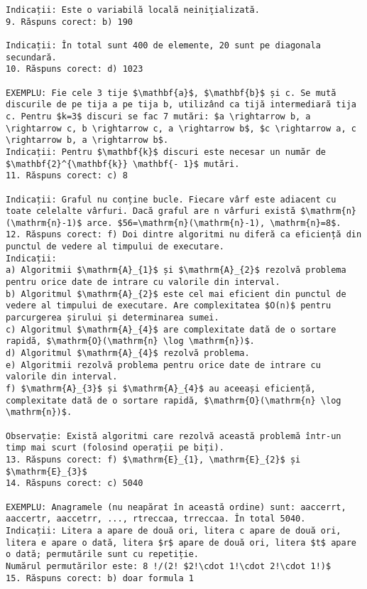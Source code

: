 \begin{verbatim}
Indicații: Este o variabilă locală neiniţializată.
9. Răspuns corect: b) 190

Indicații: În total sunt 400 de elemente, 20 sunt pe diagonala secundară.
10. Răspuns corect: d) 1023

EXEMPLU: Fie cele 3 tije $\mathbf{a}$, $\mathbf{b}$ și c. Se mută discurile de pe tija a pe tija b, utilizând ca tijă intermediară tija c. Pentru $k=3$ discuri se fac 7 mutări: $a \rightarrow b, a \rightarrow c, b \rightarrow c, a \rightarrow b$, $c \rightarrow a, c \rightarrow b, a \rightarrow b$.
Indicații: Pentru $\mathbf{k}$ discuri este necesar un număr de $\mathbf{2}^{\mathbf{k}} \mathbf{- 1}$ mutări.
11. Răspuns corect: c) 8

Indicații: Graful nu conține bucle. Fiecare vârf este adiacent cu toate celelalte vârfuri. Dacă graful are n vârfuri există $\mathrm{n}(\mathrm{n}-1)$ arce. $56=\mathrm{n}(\mathrm{n}-1), \mathrm{n}=8$.
12. Răspuns corect: f) Doi dintre algoritmi nu diferă ca eficiență din punctul de vedere al timpului de executare.
Indicații:
a) Algoritmii $\mathrm{A}_{1}$ și $\mathrm{A}_{2}$ rezolvă problema pentru orice date de intrare cu valorile din interval.
b) Algoritmul $\mathrm{A}_{2}$ este cel mai eficient din punctul de vedere al timpului de executare. Are complexitatea $O(n)$ pentru parcurgerea șirului și determinarea sumei.
c) Algoritmul $\mathrm{A}_{4}$ are complexitate dată de o sortare rapidă, $\mathrm{O}(\mathrm{n} \log \mathrm{n})$.
d) Algoritmul $\mathrm{A}_{4}$ rezolvă problema.
e) Algoritmii rezolvă problema pentru orice date de intrare cu valorile din interval.
f) $\mathrm{A}_{3}$ și $\mathrm{A}_{4}$ au aceeași eficiență, complexitate dată de o sortare rapidă, $\mathrm{O}(\mathrm{n} \log \mathrm{n})$.

Observație: Există algoritmi care rezolvă această problemă într-un timp mai scurt (folosind operații pe biți).
13. Răspuns corect: f) $\mathrm{E}_{1}, \mathrm{E}_{2}$ și $\mathrm{E}_{3}$
14. Răspuns corect: c) 5040

EXEMPLU: Anagramele (nu neapărat în această ordine) sunt: aaccerrt, aaccertr, aaccetrr, ..., rtreccaa, trreccaa. În total 5040.
Indicații: Litera a apare de două ori, litera c apare de două ori, litera e apare o dată, litera $r$ apare de două ori, litera $t$ apare o dată; permutările sunt cu repetiție.
Numărul permutărilor este: 8 !/(2! $2!\cdot 1!\cdot 2!\cdot 1!)$
15. Răspuns corect: b) doar formula 1


\end{verbatim}
